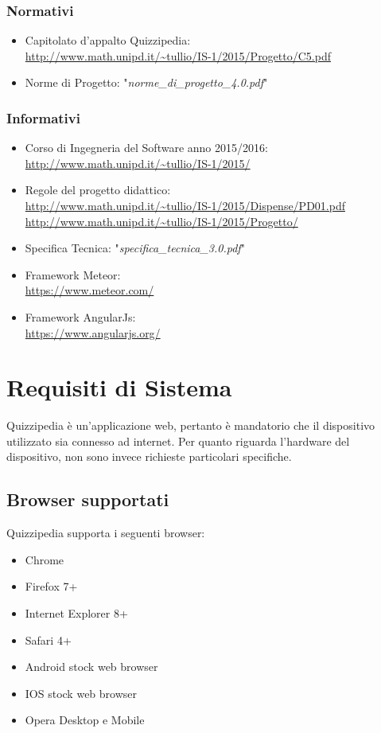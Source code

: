 \documentclass[a4paper,11pt]{article}
\begin{document}
		\subsubsection{Normativi}

		\begin{itemize}
			\item Capitolato d'appalto Quizzipedia:\\
			\url{http://www.math.unipd.it/~tullio/IS-1/2015/Progetto/C5.pdf}
			\item Norme di Progetto: "\textit{norme\_di\_progetto\_4.0.pdf}"
		\end{itemize}
		\subsubsection{Informativi}
		\begin{itemize}
			\item Corso di Ingegneria del Software anno 2015/2016:\\
			\url{http://www.math.unipd.it/~tullio/IS-1/2015/}
			\item Regole del progetto didattico:\\
			\url{http://www.math.unipd.it/~tullio/IS-1/2015/Dispense/PD01.pdf}\\
			\url{http://www.math.unipd.it/~tullio/IS-1/2015/Progetto/}
			\item Specifica Tecnica: "\textit{specifica\_tecnica\_3.0.pdf}"
			\item Framework Meteor:\\
			\url{https://www.meteor.com/}
			\item Framework AngularJs:\\
			\url{https://www.angularjs.org/}
		\end{itemize}
	\pagebreak
	\newpage
\section{Requisiti di Sistema}
Quizzipedia è un'applicazione web, pertanto è mandatorio che il dispositivo utilizzato sia connesso ad internet. Per quanto riguarda l'hardware del dispositivo, non sono invece richieste particolari specifiche.
\subsection{Browser supportati}
Quizzipedia supporta i seguenti browser:
\begin{itemize}
	\item Chrome
	\item Firefox 7+
	\item Internet Explorer 8+
	\item Safari 4+
	\item Android stock web browser
	\item IOS stock web browser
	\item Opera Desktop e Mobile
\end{itemize}
\end{document}
